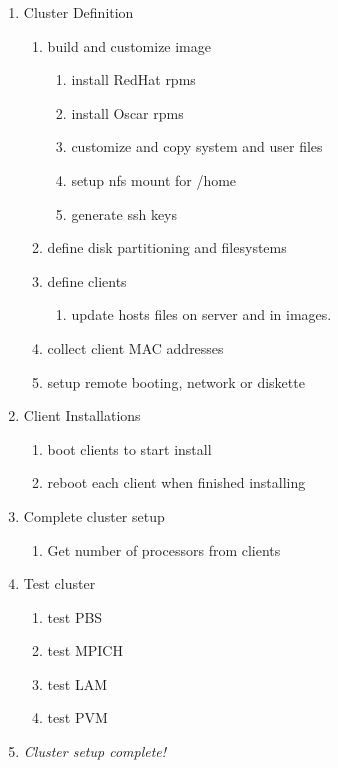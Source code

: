 \begin{enumerate}
        \item Cluster Definition
        \begin{enumerate}
                \item build and customize image
                \begin{enumerate}
                        \item install RedHat rpms
                        \item install Oscar rpms
                        \item customize and copy system and user files
                        \item setup nfs mount for /home
                        \item generate ssh keys
                \end{enumerate}
                \item define disk partitioning and filesystems
                \item define clients
                \begin{enumerate}
                        \item update hosts files on server and in images.
                \end{enumerate}
                \item collect client MAC addresses
                \item setup remote booting, network or diskette
        \end{enumerate}

        \item Client Installations
        \begin{enumerate}
                \item boot clients to start install
                \item reboot each client when finished installing
        \end{enumerate}
        \item Complete cluster setup
        \begin{enumerate}
                \item Get number of processors from clients
        \end{enumerate}
        \item Test cluster
        \begin{enumerate}
                \item test PBS
                \item test MPICH
                \item test LAM
                \item test PVM
        \end{enumerate}
        \item \emph{Cluster setup complete!}
\end{enumerate}

